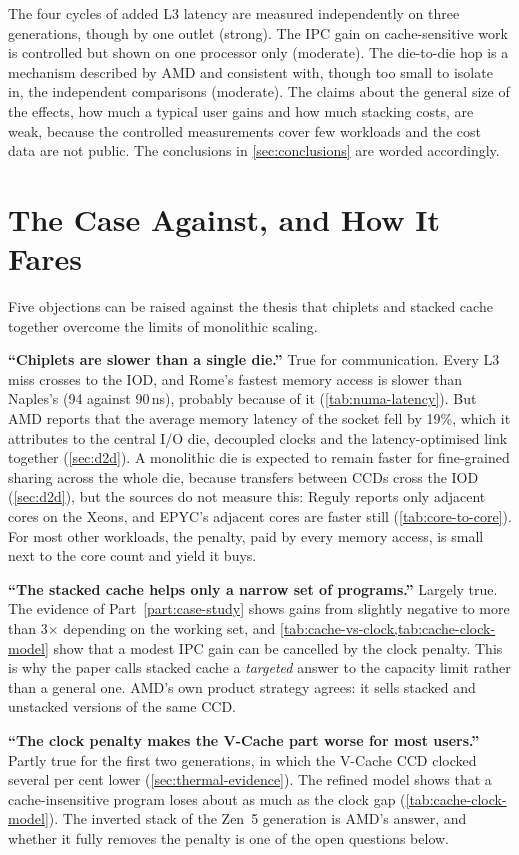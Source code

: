 The four cycles of added L3 latency are measured independently on three generations, though by one outlet (strong). The IPC gain on cache-sensitive work is controlled but shown on one processor only (moderate). The die-to-die hop is a mechanism described by AMD and consistent with, though too small to isolate in, the independent comparisons (moderate). The claims about the general size of the effects, how much a typical user gains and how much stacking costs, are weak, because the controlled measurements cover few workloads and the cost data are not public. The conclusions in \cref{sec:conclusions} are worded accordingly.

\section{The Case Against, and How It Fares}
\label{sec:case-against}
Five objections can be raised against the thesis that chiplets and stacked cache together overcome the limits of monolithic scaling.

\textbf{``Chiplets are slower than a single die.''} True for communication. Every L3 miss crosses to the IOD, and Rome's fastest memory access is slower than Naples's (94 against 90\,ns), probably because of it (\cref{tab:numa-latency}). But AMD reports that the average memory latency of the socket fell by 19\%, which it attributes to the central I/O die, decoupled clocks and the latency-optimised link together (\cref{sec:d2d}). A monolithic die is expected to remain faster for fine-grained sharing across the whole die, because transfers between CCDs cross the IOD (\cref{sec:d2d}), but the sources do not measure this: Reguly reports only adjacent cores on the Xeons, and EPYC's adjacent cores are faster still (\cref{tab:core-to-core}). For most other workloads, the penalty, paid by every memory access, is small next to the core count and yield it buys.

\textbf{``The stacked cache helps only a narrow set of programs.''} Largely true. The evidence of Part~\ref{part:case-study} shows gains from slightly negative to more than 3$\times$ depending on the working set, and \cref{tab:cache-vs-clock,tab:cache-clock-model} show that a modest IPC gain can be cancelled by the clock penalty. This is why the paper calls stacked cache a \emph{targeted} answer to the capacity limit rather than a general one. AMD's own product strategy agrees: it sells stacked and unstacked versions of the same CCD.

\textbf{``The clock penalty makes the V-Cache part worse for most users.''} Partly true for the first two generations, in which the V-Cache CCD clocked several per cent lower (\cref{sec:thermal-evidence}). The refined model shows that a cache-insensitive program loses about as much as the clock gap (\cref{tab:cache-clock-model}). The inverted stack of the Zen~5 generation is AMD's answer, and whether it fully removes the penalty is one of the open questions below.

